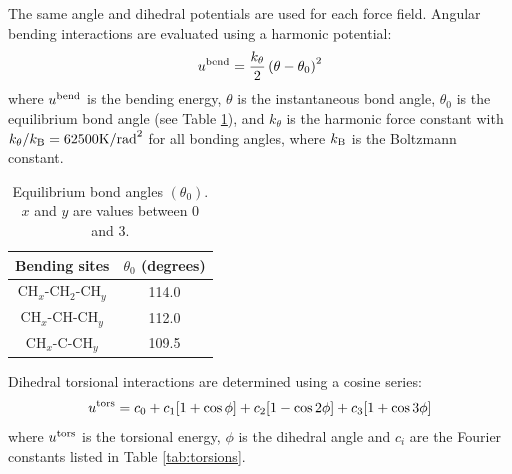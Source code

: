 \documentclass[preprint,review,12pt]{elsarticle}
\begin{document}
    
    
    The same angle and dihedral potentials are used for each force field. Angular bending interactions are evaluated using a harmonic potential:
	\begin{equation}
	u^{\rm bend} = \frac{k_\theta}{2} \left(\theta-\theta_0\right)^2
	\end{equation}
	where $u^{\rm bend}$ is the bending energy, $\theta$ is the instantaneous bond angle, $\theta_0$ is the equilibrium bond angle (see Table \ref{tab:angles}), and $k_\theta$ is the harmonic force constant with $k_\theta/k_{\rm B} = 62500 \rm{K/rad}^2$ for all bonding angles, where $k_{\rm B}$ is the Boltzmann constant. 
	 
	 
	\begin{table}[h!]
		\caption{Equilibrium bond angles $(\theta_0)$. $x$ and $y$ are values between 0 and 3.} \label{tab:angles}
		\begin{center}
			\begin{tabular}{|c|c|}
				\hline
				Bending sites & $\theta_0$ (degrees) \\ \hline
				CH$_x$-CH$_2$-CH$_y$ & 114.0 \\ 
				CH$_x$-CH-CH$_y$ & 112.0 \\ 
				CH$_x$-C-CH$_y$ & 109.5 \\  
				\hline
			\end{tabular}
		\end{center} 
	\end{table}
	
	Dihedral torsional interactions are determined using a cosine series:
	\begin{equation}
	u^{\rm tors} = c_0 + c_1 [1+\cos{\phi}] + c_2 [1-\cos{2\phi}] + c_3 [1+\cos{3\phi}]
	\end{equation}
	where $u^{\rm tors}$ is the torsional energy, $\phi$ is the dihedral angle and $c_i$ are the Fourier constants listed in Table \ref{tab:torsions}.
	
\end{document}
